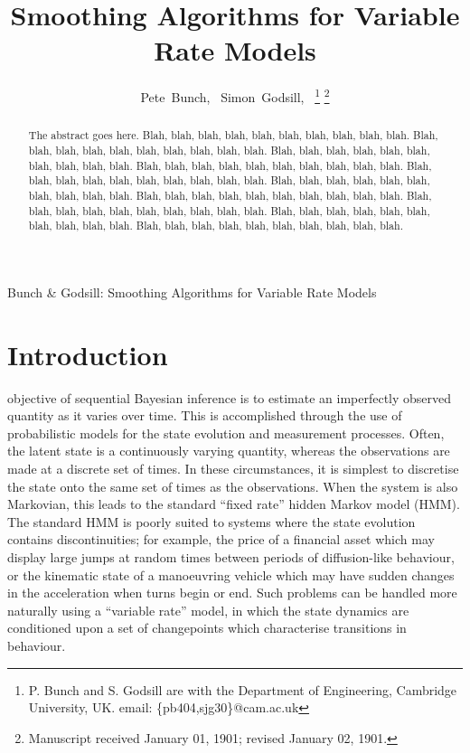 \documentclass[journal]{IEEEtran}
\begin{document}
\title{Smoothing Algorithms for Variable Rate Models}

\author{Pete~Bunch,~
        Simon~Godsill,~%
\thanks{P. Bunch and S. Godsill are with the Department
of Engineering, Cambridge University, UK. email: \{pb404,sjg30\}@cam.ac.uk}%
\thanks{Manuscript received January 01, 1901; revised January 02, 1901.}}

%
{Bunch \& Godsill: Smoothing Algorithms for Variable Rate Models}

\maketitle

\begin{abstract}
The abstract goes here. Blah, blah, blah, blah, blah, blah, blah, blah, blah, blah. Blah, blah, blah, blah, blah, blah, blah, blah, blah, blah. Blah, blah, blah, blah, blah, blah, blah, blah, blah, blah. Blah, blah, blah, blah, blah, blah, blah, blah, blah, blah. Blah, blah, blah, blah, blah, blah, blah, blah, blah, blah. Blah, blah, blah, blah, blah, blah, blah, blah, blah, blah. Blah, blah, blah, blah, blah, blah, blah, blah, blah, blah. Blah, blah, blah, blah, blah, blah, blah, blah, blah, blah. Blah, blah, blah, blah, blah, blah, blah, blah, blah, blah. Blah, blah, blah, blah, blah, blah, blah, blah, blah, blah.
\end{abstract}

\begin{IEEEkeywords}

\end{IEEEkeywords}



\section{Introduction}

 objective of sequential Bayesian inference is to estimate an imperfectly observed quantity as it varies over time. This is accomplished through the use of probabilistic models for the state evolution and measurement processes. Often, the latent state is a continuously varying quantity, whereas the observations are made at a discrete set of times. In these circumstances, it is simplest to discretise the state onto the same set of times as the observations. When the system is also Markovian, this leads to the standard ``fixed rate'' hidden Markov model (HMM). The standard HMM is poorly suited to systems where the state evolution contains discontinuities; for example, the price of a financial asset which may display large jumps at random times between periods of diffusion-like behaviour, or the kinematic state of a manoeuvring vehicle which may have sudden changes in the acceleration when turns begin or end. Such problems can be handled more naturally using a ``variable rate'' model, in which the state dynamics are conditioned upon a set of changepoints which characterise transitions in behaviour.
\end{document}
